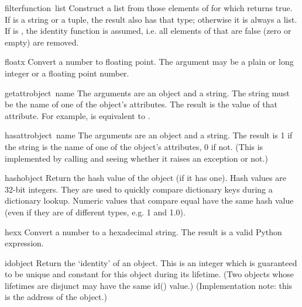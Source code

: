 \begin{funcdesc}{filter}{function\, list}
Construct a list from those elements of  for which
 returns true.  If  is a string or a tuple,
the result also has that type; otherwise it is always a list.  If
 is , the identity function is assumed,
i.e. all elements of  that are false (zero or empty) are
removed.
\end{funcdesc}

\begin{funcdesc}{float}{x}
  Convert a number to floating point.  The argument may be a plain or
  long integer or a floating point number.
\end{funcdesc}

\begin{funcdesc}{getattr}{object\, name}
  The arguments are an object and a string.  The string must be the
  name
  of one of the object's attributes.  The result is the value of that
  attribute.  For example,  is equivalent to
  .
\end{funcdesc}

\begin{funcdesc}{hasattr}{object\, name}
  The arguments are an object and a string.  The result is 1 if the
  string is the name of one of the object's attributes, 0 if not.
  (This is implemented by calling  and
  seeing whether it raises an exception or not.)
\end{funcdesc}

\begin{funcdesc}{hash}{object}
  Return the hash value of the object (if it has one).  Hash values
  are 32-bit integers.  They are used to quickly compare dictionary
  keys during a dictionary lookup.  Numeric values that compare equal
  have the same hash value (even if they are of different types, e.g.
  1 and 1.0).
\end{funcdesc}

\begin{funcdesc}{hex}{x}
  Convert a number to a hexadecimal string.  The result is a valid
  Python expression.
\end{funcdesc}

\begin{funcdesc}{id}{object}
  Return the `identity' of an object.  This is an integer which is
  guaranteed to be unique and constant for this object during its
  lifetime.  (Two objects whose lifetimes are disjunct may have the
  same id() value.)  (Implementation note: this is the address of the
  object.)
\end{funcdesc}

